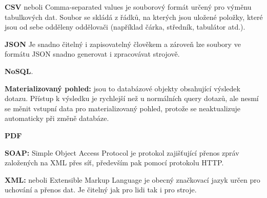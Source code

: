 \documentclass[czech,BP]{thesiskiv}
\begin{document}
\textbf{CSV} neboli Comma-separated values je souborový formát určený pro výměnu tabulkových dat. Soubor se skládá z řádků, na kterých jsou uložené položky, které jsou od sebe odděleny oddělovači (například čárka, středník, tabulátor atd.).

\textbf{JSON}  Je snadno čitelný i zapisovatelný člověkem a zároveň lze soubory ve formátu JSON snadno generovat i zpracovávat strojově.\cite{JSON}

\textbf{NoSQL}.\cite{NoSQL}

\textbf{Materializovaný pohled:} jsou to databázové objekty obsahující výsledek dotazu. Přístup k výsledku je rychlejší než u normálních query dotazů, ale nesmí se měnit vstupní data pro materializovaný pohled, protože se neaktualizuje automaticky při změně databáze.

\textbf{PDF}  \citealp{PDF}

\textbf{SOAP:} Simple Object Access Protocol je protokol zajišťující přenos zpráv založených na XML přes síť, především pak pomocí protokolu HTTP.

\textbf{XML:} neboli Extensible Markup Language je obecný značkovací jazyk určen pro uchování a přenos dat. Je čitelný jak pro lidi tak i pro stroje.


{\raggedright\small

}
\end{document}
